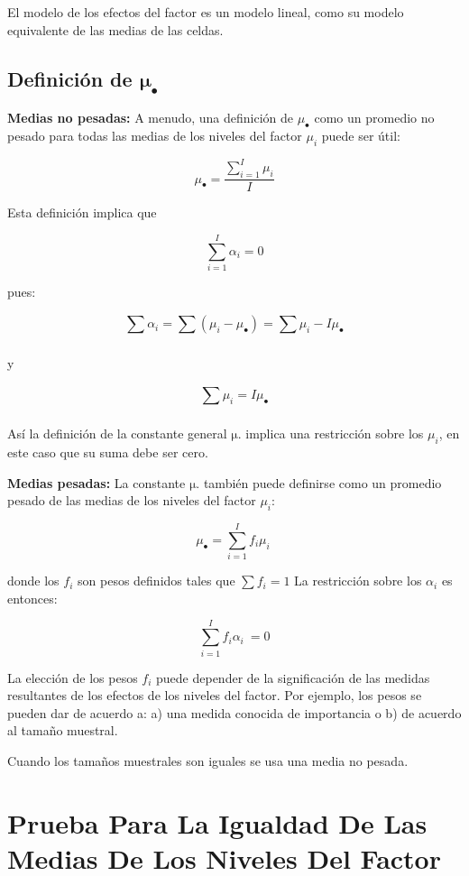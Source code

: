 \documentclass[]{book}
\theoremstyle{definition}
\theoremstyle{definition}
\theoremstyle{definition}
\theoremstyle{remark}
\begin{document}
El modelo de los efectos del factor es un modelo lineal, como su modelo
equivalente de las medias de las celdas.

\hypertarget{definicion-de-mathbfmu_mathbfbullet}{%
\subsection{\texorpdfstring{Definición de
\(\mathbf{\mu}_{\mathbf{\bullet}}\)}{Definición de \textbackslash{}mathbf\{\textbackslash{}mu\}\_\{\textbackslash{}mathbf\{\textbackslash{}bullet\}\}}}\label{definicion-de-mathbfmu_mathbfbullet}}

\textbf{Medias no pesadas:} A menudo, una definición de
\(\mu_{\bullet}\) como un promedio no pesado para todas las medias de
los niveles del factor \(\mu_{i}\) puede ser útil:

\[
\mu_{\bullet} = \frac{\sum_{i = 1}^{I}\mu_{i}}{I}
\]

Esta definición implica que

\[
\sum_{i = 1}^{I}\alpha_{i} = 0
\]

pues:

\[
\sum_{}^{}\alpha_{i} = \sum_{}^{}\left( \mu_{i} - \mu_{\bullet} \right) = \sum_{}^{}\mu_{i} - I\mu_{\bullet}
\]

y

\[
\sum_{}^{}\mu_{i} = I\mu_{\bullet}
\]

Así la definición de la constante general \(\text{μ.}\) implica una
restricción sobre los \(\mu_{i}\), en este caso que su suma debe ser
cero.

\textbf{Medias pesadas:} La constante \(\text{μ.}\) también puede
definirse como un promedio pesado de las medias de los niveles del
factor \(\mu_{i}\):

\[
\mu_{\bullet} = \sum_{i = 1}^{I}{f_{i}\mu_{i}\ }
\]

donde los \(f_{i}\) son pesos definidos tales que \(\sum f_{i} = 1\) La
restricción sobre los \(\alpha_{i}\) es entonces:

\[
\sum_{i = 1}^{I}{f_{i}\alpha_{i}\ } = 0
\]

La elección de los pesos \(f_{i}\) puede depender de la significación de
las medidas resultantes de los efectos de los niveles del factor. Por
ejemplo, los pesos se pueden dar de acuerdo a: a) una medida conocida de
importancia o b) de acuerdo al tamaño muestral.

Cuando los tamaños muestrales son iguales se usa una media no pesada.

\hypertarget{prueba-para-la-igualdad-de-las-medias-de-los-niveles-del-factor}{%
\section{Prueba Para La Igualdad De Las Medias De Los Niveles Del
Factor}\label{prueba-para-la-igualdad-de-las-medias-de-los-niveles-del-factor}}
\end{document}
